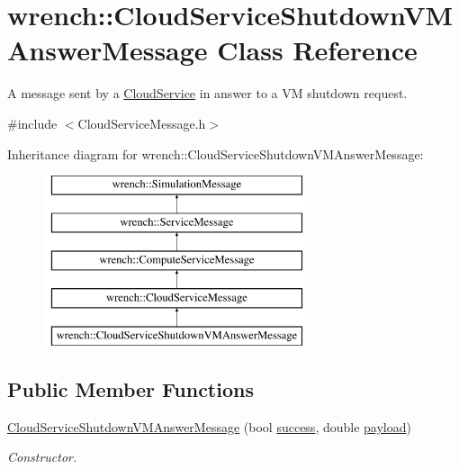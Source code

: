 \hypertarget{classwrench_1_1_cloud_service_shutdown_v_m_answer_message}{}\section{wrench\+:\+:Cloud\+Service\+Shutdown\+V\+M\+Answer\+Message Class Reference}
\label{classwrench_1_1_cloud_service_shutdown_v_m_answer_message}


A message sent by a \hyperlink{classwrench_1_1_cloud_service}{Cloud\+Service} in answer to a VM shutdown request.  




{\ttfamily \#include $<$Cloud\+Service\+Message.\+h$>$}

Inheritance diagram for wrench\+:\+:Cloud\+Service\+Shutdown\+V\+M\+Answer\+Message\+:\begin{figure}[H]
\begin{center}
\leavevmode
\includegraphics[height=5.000000cm]{classwrench_1_1_cloud_service_shutdown_v_m_answer_message}
\end{center}
\end{figure}
\subsection*{Public Member Functions}
\begin{DoxyCompactItemize}
\item 
\hyperlink{classwrench_1_1_cloud_service_shutdown_v_m_answer_message_a4990c25b9659298f72203f528cb22e79}{Cloud\+Service\+Shutdown\+V\+M\+Answer\+Message} (bool \hyperlink{classwrench_1_1_cloud_service_shutdown_v_m_answer_message_a02e43776e1b8ca2c19c867fa73e8edf2}{success}, double \hyperlink{classwrench_1_1_simulation_message_a914f2732713f7c02898e66f05a7cb8a1}{payload})
\begin{DoxyCompactList}\small\item\em Constructor. \end{DoxyCompactList}\end{DoxyCompactItemize}
